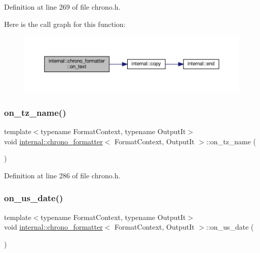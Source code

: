 Definition at line 269 of file chrono.\+h.

Here is the call graph for this function\+:
\nopagebreak
\begin{figure}[H]
\begin{center}
\leavevmode
\includegraphics[width=350pt]{structinternal_1_1chrono__formatter_aaae159c7a01320f53cf0ce746fc855ea_cgraph}
\end{center}
\end{figure}
\mbox{\label{structinternal_1_1chrono__formatter_a910fce1f44ec83ca85ff6cb5ebbb3771}} 
\subsubsection{\texorpdfstring{on\+\_\+tz\+\_\+name()}{on\_tz\_name()}}
{\footnotesize\ttfamily template$<$typename Format\+Context, typename Output\+It$>$ \\
void \hyperlink{structinternal_1_1chrono__formatter}{internal\+::chrono\+\_\+formatter}$<$ Format\+Context, Output\+It $>$\+::on\+\_\+tz\+\_\+name (\begin{DoxyParamCaption}{ }\end{DoxyParamCaption})\hspace{0.3cm}{\ttfamily [inline]}}



Definition at line 286 of file chrono.\+h.

\mbox{\label{structinternal_1_1chrono__formatter_a831055cd8da4eecca5d501d8b14722b1}} 
\subsubsection{\texorpdfstring{on\+\_\+us\+\_\+date()}{on\_us\_date()}}
{\footnotesize\ttfamily template$<$typename Format\+Context, typename Output\+It$>$ \\
void \hyperlink{structinternal_1_1chrono__formatter}{internal\+::chrono\+\_\+formatter}$<$ Format\+Context, Output\+It $>$\+::on\+\_\+us\+\_\+date (\begin{DoxyParamCaption}{ }\end{DoxyParamCaption})\hspace{0.3cm}{\ttfamily [inline]}}



